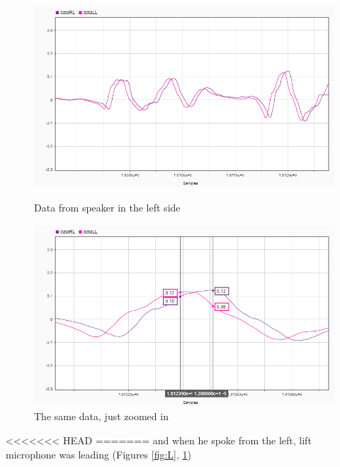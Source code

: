 \begin{figure}[htp]
\centering
\begin{minipage}{.55\textwidth}
  \centering
  \includegraphics[width=1\linewidth]{Illustrations/DataL.png}
  \caption{Data from speaker in the left side}
  \label{fig:L}
\end{minipage}%
\begin{minipage}{.55\textwidth}
  \centering
  \includegraphics[width=1\linewidth]{Illustrations/DataL_with_Markers.png}
  \caption{The same data, just zoomed in}
  \label{fig:closeL}
\end{minipage}
\end{figure}

<<<<<<< HEAD
=======
 and when he spoke from the left, lift microphone was leading (Figures  \ref{fig:L}, \ref{fig:closeL})
 
